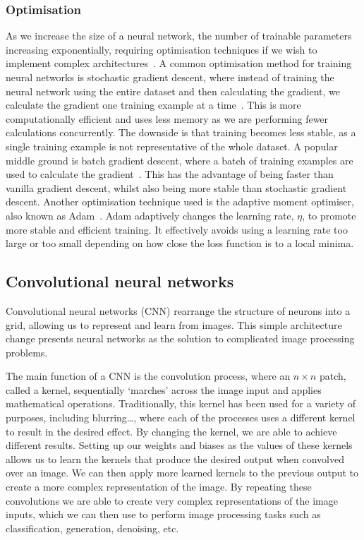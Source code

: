 \subsubsection{Optimisation}
As we increase the size of a neural network, the number of trainable parameters increasing exponentially, requiring optimisation techniques if we wish to implement complex architectures~\cite{ref}. A common optimisation method for training neural networks is stochastic gradient descent, where instead of training the neural network using the entire dataset and then calculating the gradient, we calculate the gradient one training example at a time~\cite{ref}. This is more computationally efficient and uses less memory as we are performing fewer calculations concurrently. The downside is that training becomes less stable, as a single training example is not representative of the whole dataset. A popular middle ground is batch gradient descent, where a batch of training examples are used to calculate the gradient~\cite{ref}. This has the advantage of being faster than vanilla gradient descent, whilst also being more stable than stochastic gradient descent. Another optimisation technique used is the adaptive moment optimiser, also known as Adam~\cite{ref}. Adam adaptively changes the learning rate, $\eta$, to promote more stable and efficient training. It effectively avoids using a learning rate too large or too small depending on how close the loss function is to a local minima.

\subsection{Convolutional neural networks}
Convolutional neural networks (CNN) rearrange the structure of neurons into a grid, allowing us to represent and learn from images. This simple architecture change presents neural networks as the solution to complicated image processing problems.

The main function of a CNN is the convolution process, where an $n \times n$ patch, called a kernel, sequentially `marches' across the image input and applies mathematical operations. Traditionally, this kernel has been used for a variety of purposes, including blurring\dots, where each of the processes uses a different kernel to result in the desired effect. By changing the kernel, we are able to achieve different results. Setting up our weights and biases as the values of these kernels allows us to learn the kernels that produce the desired output when convolved over an image. We can then apply more learned kernels to the previous output to create a more complex representation of the image. By repeating these convolutions we are able to create very complex representations of the image inputs, which we can then use to perform image processing tasks such as classification, generation, denoising, etc.

